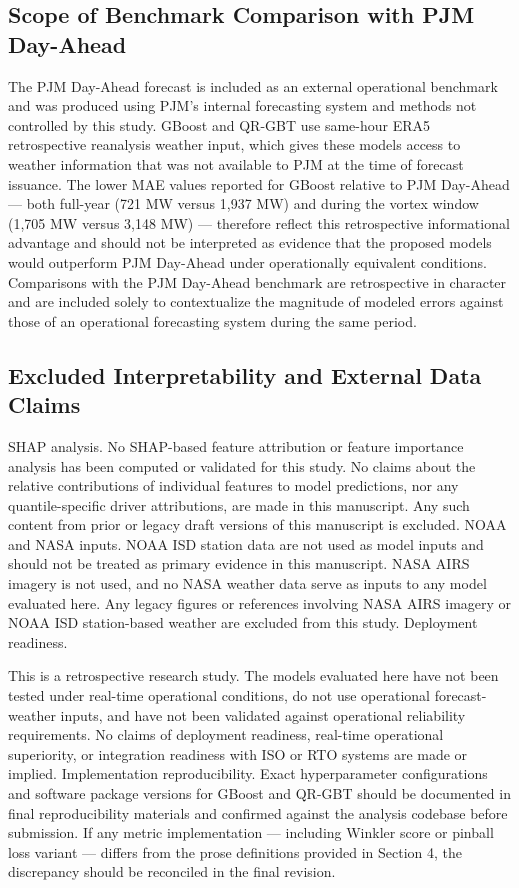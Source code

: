 \documentclass[12pt,a4paper]{article}
\begin{document}
\subsection{Scope of Benchmark Comparison with PJM Day-Ahead}


The PJM Day-Ahead forecast is included as an external operational benchmark and was produced using PJM's internal forecasting system and methods not controlled by this study. GBoost and QR-GBT use same-hour ERA5 retrospective reanalysis weather input, which gives these models access to weather information that was not available to PJM at the time of forecast issuance. The lower MAE values reported for GBoost relative to PJM Day-Ahead --- both full-year (721 MW versus 1,937 MW) and during the vortex window (1,705 MW versus 3,148 MW) --- therefore reflect this retrospective informational advantage and should not be interpreted as evidence that the proposed models would outperform PJM Day-Ahead under operationally equivalent conditions. Comparisons with the PJM Day-Ahead benchmark are retrospective in character and are included solely to contextualize the magnitude of modeled errors against those of an operational forecasting system during the same period.
\subsection{Excluded Interpretability and External Data Claims}
SHAP analysis. No SHAP-based feature attribution or feature importance analysis has been computed or validated for this study. No claims about the relative contributions of individual features to model predictions, nor any quantile-specific driver attributions, are made in this manuscript. Any such content from prior or legacy draft versions of this manuscript is excluded.
NOAA and NASA inputs. NOAA ISD station data are not used as model inputs and should not be treated as primary evidence in this manuscript. NASA AIRS imagery is not used, and no NASA weather data serve as inputs to any model evaluated here. Any legacy figures or references involving NASA AIRS imagery or NOAA ISD station-based weather are excluded from this study.
Deployment readiness. 

This is a retrospective research study. The models evaluated here have not been tested under real-time operational conditions, do not use operational forecast-weather inputs, and have not been validated against operational reliability requirements. No claims of deployment readiness, real-time operational superiority, or integration readiness with ISO or RTO systems are made or implied.
Implementation reproducibility. Exact hyperparameter configurations and software package versions for GBoost and QR-GBT should be documented in final reproducibility materials and confirmed against the analysis codebase before submission. If any metric implementation --- including Winkler score or pinball loss variant --- differs from the prose definitions provided in Section 4, the discrepancy should be reconciled in the final revision.
\end{document}
